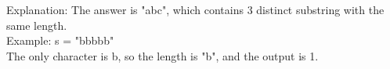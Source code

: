 \documentclass[preview]{standalone}
\begin{document}
Explanation: The answer is "abc", which contains 3 distinct substring with the same length.\\Example: s = "bbbbb"\\The only character is b, so the length is "b", and the output is 1.\\
\end{document}
